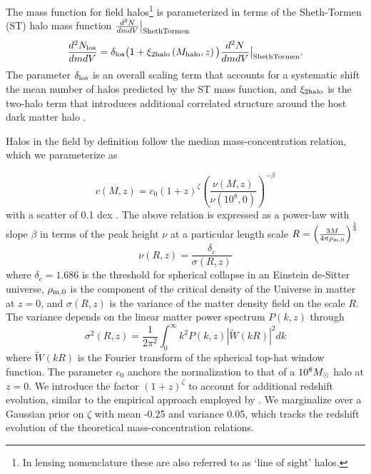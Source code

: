 The mass function for field halos\footnote{In lensing nomenclature these are also referred to as `line of sight' halos.} is parameterized in terms of the Sheth-Tormen (ST) halo mass function \cite{ST99} $\frac{d^2N}{dm  dV} \big \vert_{\rm{ShethTormen}}$
\begin{equation}
\label{eqn:LOSmfunc}
\frac{d^2N_{\rm{los}}}{dm  dV} = {\delta_{\rm{los}}} \big(1+ \xi_{\rm{2halo}}\left(M_{\rm{halo}}, z\right)\big) \frac{d^2N}{dm  dV} \big \vert_{\rm{ShethTormen}}.
\end{equation}
The parameter ${\delta_{\rm{los}}}$ is an overall scaling term that accounts for a systematic shift the mean number of halos predicted by the ST mass function, and $\xi_{\rm{2halo}}$ is the two-halo term that introduces additional correlated structure around the host dark matter halo \cite{Gilman++19b}.

Halos in the field by definition follow the median mass-concentration relation, which we parameterize as 

\begin{equation}
\label{eqn:mcrelation}
c\left(M, z\right) = c_0  \left(1+z\right)^{\zeta} \left(\frac{\nu\left(M, z\right)}{\nu\left(10^8, 0\right)}\right)^{-\beta}
\end{equation}
with a scatter of 0.1 dex \cite{Dutton++14}. The above relation is expressed as a power-law with slope $\beta$ in terms of the peak height $\nu$ at a particular length scale $R = \left(\frac{3M}{4 \pi \rho_{\rm{m,0}} }\right)^\frac{1}{3}$
\begin{equation}
\nonumber\nu\left(R,z\right) = \frac{\delta_c}{\sigma \left(R,z\right)}
\end{equation}
where $\delta_c = 1.686$ is the threshold for spherical collapse in an Einstein de-Sitter universe, $\rho_{\rm{m,0}}$ is the component of the critical density of the Universe in matter at $z=0$, and $\sigma\left(R,z\right)$ is the variance of the matter density field on the scale $R$. The variance depends on the linear matter power spectrum $P\left(k,z\right)$ through
\begin{equation}
\label{eqn:variance}
\sigma^{2}\left(R,z\right) = \frac{1}{2 \pi^2}\int_{0}^{\infty} k^2 P\left(k,z\right) |\tilde{W}\left(kR\right)|^{2} dk
\end{equation}
where $\tilde{W}\left(kR\right)$ is the Fourier transform of the spherical top-hat window function. The parameter $c_0$ anchors the normalization to that of a $10^{8} {M_{\odot}}$ halo at $z=0$. We introduce the factor $\left(1+z\right)^{\zeta}$ to account for additional redshift evolution, similar to the empirical approach employed by \cite{Prada++12}. We marginalize over a Gaussian prior on $\zeta$ with mean -0.25 and variance 0.05, which tracks the redshift evolution of the theoretical mass-concentration relations. 

